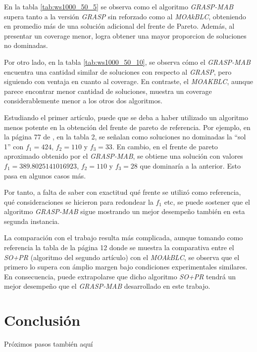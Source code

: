 \documentclass[12pt,a4paper]{book}
\begin{document}
En la tabla \ref{tab:ws1000_50_5} se observa como el algoritmo \textit{GRASP-MAB} supera tanto a la versión \textit{GRASP} sin reforzado como al \textit{MOAkBLC}, obteniendo en promedio más de una solución adicional del frente de Pareto.
Además, al presentar un coverage menor, logra obtener una mayor proporcion de soluciones no dominadas.

Por otro lado, en la tabla \ref{tab:ws1000_50_10}, se observa cómo el \textit{GRASP-MAB} encuentra una cantidad similar de soluciones con respecto al \textit{GRASP}, pero siguiendo con ventaja en cuanto al coverage.
En contraste, el \textit{MOAKBLC}, aunque parece encontrar menor cantidad de soluciones, muestra un coverage considerablemente menor a los otros dos algoritmos. 

Estudiando el primer artículo, puede que se deba a haber utilizado un algoritmo menos potente en la obtención del frente de pareto de referencia. Por ejemplo, en la página 77 de \cite{k-balanced_1}, en la tabla 2,
se señalan como soluciones no dominadas la ``sol 1'' con $f_1=424$, $f_2=110$ y $f_3=33$. En cambio, en el frente de pareto aproximado obtenido por el \textit{GRASP-MAB}, se obtiene una solución con valores $f_1=389.8025141016923$, $f_2=110$ y $f_3=28$ que dominaría a la anterior. Esto
pasa en algunos casos más.

Por tanto, a falta de saber con exactitud qué frente se utilizó como referencia, qué consideraciones se hicieron para redondear la $f_1$ etc, se puede sostener
que el algoritmo \textit{GRASP-MAB} sigue mostrando un mejor desempeño también en esta segunda instancia.

La comparación con el trabajo \cite{k-Balanced_2} resulta más complicada, aunque tomando como referencia la tabla de la página 12 donde se muestra la comparativa entre el \textit{SO+PR} (algoritmo del segundo artículo) con el \textit{MOAkBLC}, se observa que el primero lo supera con ámplio margen bajo
condiciones experimentales similares. En consecuencia, puede extrapolarse que dicho algoritmo \textit{SO+PR} tendrá un mejor desempeño que el \textit{GRASP-MAB} desarrollado en este trabajo.

\chapter{Conclusión}

Próximos pasos también aquí


\end{document}
